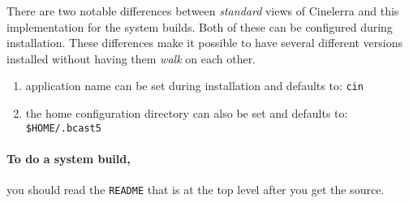 There are two notable differences between \textit{standard} views of Cinelerra and this implementation for the system builds.  
Both of these can be configured during installation.  
These differences make it possible to have several different versions installed without having them \textit{walk} on each other. 

\begin{enumerate}
    \item 
        application name can be set during installation and defaults to: \texttt{cin}
    \item 
        the home configuration directory can also be set and defaults to:\\ \texttt{\$HOME/.bcast5}
\end{enumerate}

\paragraph{To do a system build,} you should read the \texttt{README} that is at the top level after you get the source.


